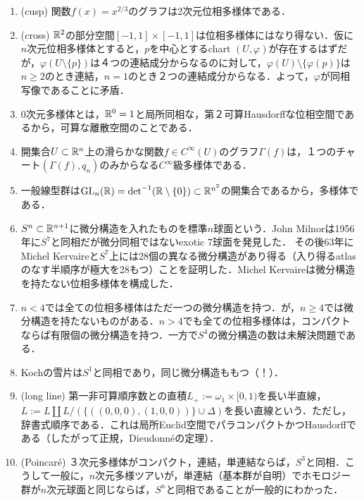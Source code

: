 \documentclass[uplatex,dvipdfmx]{jsreport}
\begin{document}
\begin{example}\mbox{}
    \begin{enumerate}
        \item (cusp) 関数$f(x)=x^{2/3}$のグラフは2次元位相多様体である．
        \item (cross) $\mathbb{R}^2$の部分空間$[-1,1]\times[-1,1]$は位相多様体にはなり得ない．仮に$n$次元位相多様体とすると，$p$を中心とするchart $(U,\varphi)$が存在するはずだが，$\varphi(U\setminus\{p\})$は４つの連結成分からなるのに対して，$\varphi(U)\setminus\{\varphi(p)\}$は$n\ge 2$のとき連結，$n=1$のとき２つの連結成分からなる．よって，$\varphi$が同相写像であることに矛盾．
        \item $0$次元多様体とは，$\mathbb{R}^0=1$と局所同相な，第２可算Hausdorffな位相空間であるから，可算な離散空間のことである．
        \item 開集合$U\subset\mathbb{R}^n$上の滑らかな関数$f\in C^\infty(U)$のグラフ$\Gamma(f)$は，１つのチャート$(\Gamma(f),q_n)$のみからなる$C^\infty$級多様体である．
        \item 一般線型群は$\mathrm{GL}_n(\mathbb{R})=\det^{-1}(\mathbb{R}\setminus\{0\})\subset\mathbb{R}^{n^2}$の開集合であるから，多様体である．
        \item $S^n\subset\mathbb{R}^{n+1}$に微分構造を入れたものを標準$n$球面という．John Milnorは1956年に$S^7$と同相だが微分同相ではないexotic $7$球面を発見した．
        その後63年にMichel Kervaireと$S^7$上には28個の異なる微分構造があり得る（入り得るatlasのなす半順序が極大を28もつ）ことを証明した．Michel Kervaireは微分構造を持たない位相多様体を構成した．
        \item $n<4$では全ての位相多様体はただ一つの微分構造を持つ．が，$n\ge 4$では微分構造を持たないものがある．$n>4$でも全ての位相多様体は，コンパクトならば有限個の微分構造を持つ．一方で$S^4$の微分構造の数は未解決問題である．
        \item Kochの雪片は$S^1$と同相であり，同じ微分構造ももつ（！）．
        \item (long line) 第一非可算順序数との直積$L_+:=\omega_1\times[0,1)$を長い半直線，$L:=L\coprod L/(\{((0,0,0),(1,0,0))\}\cup\Delta)$を長い直線という．ただし，辞書式順序である．これは局所Euclid空間でパラコンパクトかつHausdorffである（したがって正規，Dieudonnéの定理）．
        \item (Poincaré) ３次元多様体がコンパクト，連結，単連結ならば，$S^3$と同相．こうして一般に，$n$次元多様ツアいが，単連結（基本群が自明）でホモロジー群が$n$次元球面と同じならば，$S^n$と同相であることが一般的にわかった．
    \end{enumerate}
\end{example}
\end{document}
